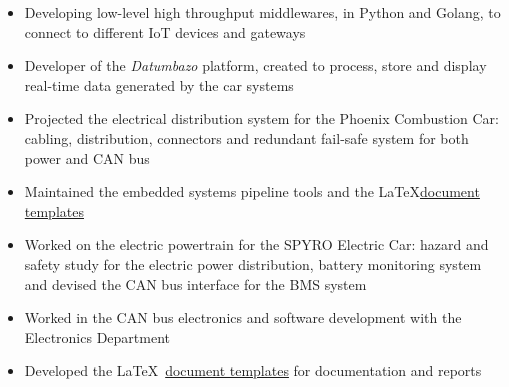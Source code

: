 \documentclass[10pt,a4paper,ragged2e,withhyper]{altacv}
\begin{document}
\begin{paracol}{2}


\begin{itemize}
  \item Developing low-level high throughput middlewares, in Python and Golang, to connect to different IoT devices and gateways
\end{itemize}


\begin{itemize}
  \item Developer of the \textit{Datumbazo} platform, created to process, store and display real-time data generated by the car systems
  \item Projected the electrical distribution system for the Phoenix Combustion Car: cabling, distribution, connectors and redundant fail-safe system for both power and CAN bus
  \item Maintained the embedded systems pipeline tools and the \LaTeX \linebreak \href{https://github.com/engeniusua/engenius-ua-latex-template}{document templates}
\end{itemize}

\divider

\begin{itemize}
  \item Worked on the electric powertrain for the SPYRO Electric Car: hazard and safety study for the electric power distribution, battery monitoring system and devised the CAN bus interface for the BMS system
  \item Worked in the CAN bus electronics and software development with the Electronics Department
  \item Developed the \LaTeX\ \href{https://github.com/engeniusua/engenius-ua-latex-template}{document templates} for documentation and reports
\end{itemize}


\end{paracol}
\end{document}
